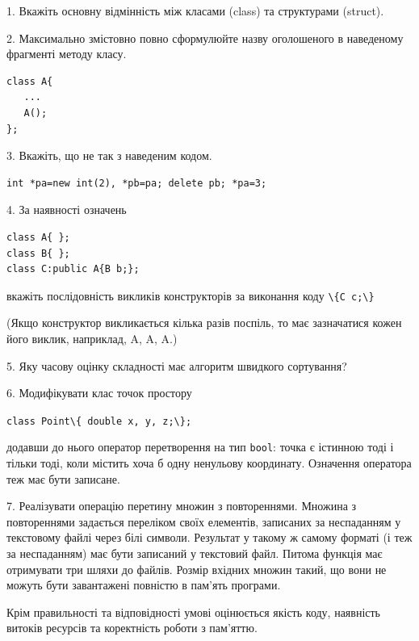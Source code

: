 \documentclass[12pt, ukrainian]{article}
\def\code#1{\Verb!#1!}
\begin{document}
{%
1. Вкажіть основну відмінність між класами (class) та структурами (struct).%
\par
\vspace{2mm}
2. Максимально змістовно повно сформулюйте назву оголошеного в наведеному фрагменті методу класу.
\vspace{-3mm}
\begin{verbatim}class A{
   ...
   A();
};\end{verbatim}
\vspace{-3mm}
\par
\vspace{2mm}
3. Вкажіть, що не так з наведеним кодом.
\vspace{-3mm}
\begin{verbatim}int *pa=new int(2), *pb=pa; delete pb; *pa=3;\end{verbatim}
\vspace{-3mm}
\par
\vspace{2mm}
4. За наявності означень
\vspace{-3mm}
\begin{verbatim}
class A{ };
class B{ };
class C:public A{B b;};\end{verbatim}
\vspace{-3mm}
вкажіть послідовність викликів конструкторів за виконання коду \code{\{C c;\}} 

(Якщо конструктор викликається кілька разів поспіль, то має зазначатися кожен його виклик, наприклад, A, A, A.)

\vspace{2mm}
5. Яку часову оцінку складності має алгоритм швидкого сортування?
\par
\vspace{2mm}
6. Модифікувати клас точок простору 

\qquad\code{class Point\{ double x, y, z;\};}


додавши до нього оператор перетворення на тип \code{bool}: точка є істинною тоді і тільки тоді, коли містить хоча б одну ненульову координату. Означення оператора теж має бути записане.%
\par
\vspace{2mm}
7. 
Реалізувати операцію перетину множин з повтореннями. Множина з повтореннями задається переліком своїх елементів, записаних за неспаданням у текстовому файлі через білі символи. Результат у такому ж самому форматі (і теж за неспаданням) має бути записаний у текстовий файл. Питома функція має отримувати три шляхи до файлів. Розмір вхідних множин такий, що вони не можуть бути завантажені повністю в пам’ять програми.

Крім правильності та відповідності умові оцінюється якість коду, наявність витоків ресурсів та коректність роботи з пам'яттю. 

}
\end{document}

